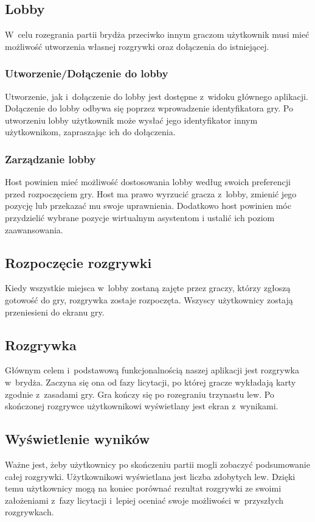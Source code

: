 \subsection{Lobby}
W~celu rozegrania partii brydża przeciwko innym graczom
użytkownik musi mieć możliwość utworzenia własnej
rozgrywki oraz dołączenia do istniejącej.

\subsubsection{Utworzenie/Dołączenie do lobby}
Utworzenie, jak i~dołączenie do lobby jest dostępne z~widoku głównego aplikacji. Dołączenie do lobby
odbywa się poprzez wprowadzenie identyfikatora gry. Po utworzeniu lobby użytkownik może
wysłać jego identyfikator innym użytkownikom, zapraszając ich do dołączenia.

\subsubsection{Zarządzanie lobby}
Host powinien mieć możliwość dostosowania lobby według swoich preferencji przed
rozpoczęciem gry. Host ma prawo wyrzucić gracza z~lobby, zmienić jego pozycję lub przekazać
mu swoje uprawnienia. Dodatkowo host powinien móc przydzielić wybrane pozycje
wirtualnym asystentom i ustalić ich poziom zaawansowania.


\subsection{Rozpoczęcie rozgrywki}
Kiedy wszystkie miejsca w~lobby zostaną zajęte przez graczy, którzy zgłoszą gotowość do gry,
rozgrywka zostaje rozpoczęta.
Wszyscy użytkownicy zostają przeniesieni do ekranu gry.


\subsection{Rozgrywka}
Głównym celem i~podstawową funkcjonalnością naszej aplikacji jest
rozgrywka w~brydża. Zaczyna się ona od fazy licytacji, po której
gracze wykładają karty zgodnie z~zasadami gry. Gra kończy się po rozegraniu
trzynastu lew. Po skończonej rozgrywce użytkownikowi wyświetlany jest ekran z~wynikami.

\subsection{Wyświetlenie wyników}
Ważne jest, żeby użytkownicy po skończeniu partii mogli zobaczyć
podsumowanie całej rozgrywki. Użytkownikowi wyświetlana jest liczba
zdobytych lew. Dzięki temu użytkownicy mogą na koniec porównać rezultat rozgrywki
ze swoimi założeniami z~fazy licytacji i~lepiej oceniać swoje możliwości w~przyszłych rozgrywkach.


